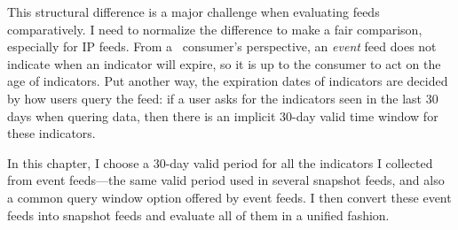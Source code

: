This structural difference is a major challenge when evaluating feeds comparatively.
I need to normalize the difference to make a fair comparison, especially for IP feeds. From a \ti\
consumer's perspective, an \emph{event} feed does not indicate when an indicator will
expire, so it is up to the consumer to act on the age of indicators. Put another way,
the expiration dates of indicators are decided by how users query the feed:
if a user asks for the indicators seen in the last 30 days
when quering data, then there is an implicit 30-day valid time window for these indicators.

In this chapter, I choose a 30-day valid period for all the indicators I collected from event feeds---the same valid period
used in several snapshot feeds, and also a common query window option offered by event feeds.
I then convert these event feeds into snapshot feeds and evaluate all of them in a unified fashion.


\begin{comment}
Snapshot sources are build on a notion of emph{state}, namely, the current indicators
in the list at a certain moment, as indicators could be added and removed from
the source over time. This type of source mainly apply for IP feeds, as IP data
is time sensitive---a malicious IP address discovered now might not be malicious
in the future. One example of such source is {\feedfeodo}\cite{Feodo}, which records
a list of current Command and Control server IPs of Feodo botnet\cite{Feodo-Tracker}
that a site should block.

Event sources, on the other hand, is ``stateless'', they focus on what have been
discovered recently. One example of this type of source is {\feednothink}\cite{Nothink}.
Upon request, it returns the source IPs they collected that have conducted SSH
brute-force attack in the last day, last week or last year, depending on the specified
query option.

This structural difference doesn't concern file hash feeds, since file hashes are time
insensitive---a malicious file hash won't change to benign in the future. One can
think of all file hash feeds as snapshot feeds where indicators never expire.
\end{comment}
